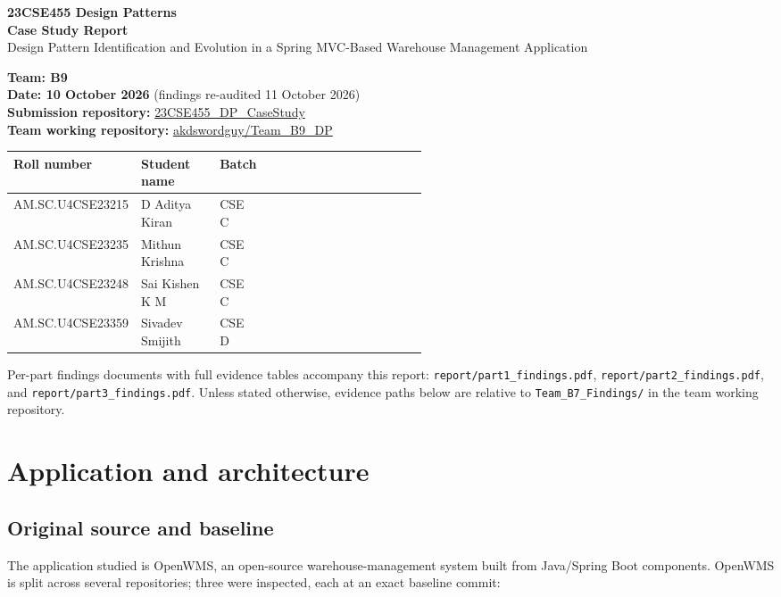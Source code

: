 \documentclass[11pt,a4paper]{article}
\title{}
\author{}
\date{}
\newcommand{\code}[1]{\nolinkurl{#1}}
\begin{document}
\begin{center}
{\Large\textbf{23CSE455 Design Patterns}}\\[4pt]
{\LARGE\textbf{Case Study Report}}\\[6pt]
{\large Design Pattern Identification and Evolution in a Spring MVC-Based Warehouse Management Application}
\end{center}

\textbf{Team: B9}\\
\textbf{Date: 10 October 2026} (findings re-audited 11 October 2026)\\
\textbf{Submission repository:} \href{https://github.com/aswathymohan-amrita/23CSE455_DP_CaseStudy}{23CSE455\_DP\_CaseStudy}\\
\textbf{Team working repository:} \href{https://github.com/akdswordguy/Team_B9_DP}{akdswordguy/Team\_B9\_DP}


\begin{tabularx}{\linewidth}{@{}P{0.25\linewidth}P{0.19\linewidth}P{0.10\linewidth}X@{}}
\toprule
Roll number & Student name & Batch \\
\midrule
AM.SC.U4CSE23215 & D Aditya Kiran & CSE C \\
AM.SC.U4CSE23235 & Mithun Krishna & CSE C \\
AM.SC.U4CSE23248 & Sai Kishen K M & CSE C\\
AM.SC.U4CSE23359 & Sivadev Smijith & CSE D \\
\bottomrule
\end{tabularx}

Per-part findings documents with full evidence tables accompany this report: \code{report/part1_findings.pdf}, \code{report/part2_findings.pdf}, and \code{report/part3_findings.pdf}. Unless stated otherwise, evidence paths below are relative to \code{Team_B7_Findings/} in the team working repository.

\section{Application and architecture}

\subsection{Original source and baseline}
The application studied is OpenWMS, an open-source warehouse-management system built from Java/Spring Boot components. OpenWMS is split across several repositories; three were inspected, each at an exact baseline commit:
\end{document}
